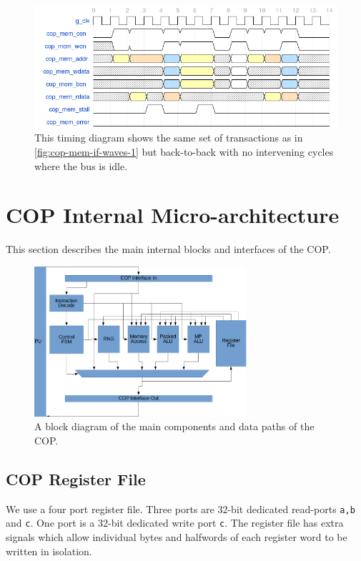 \documentclass{article}
\begin{document}
\begin{figure}[h]
\centering
\includegraphics[width=\textwidth]{./diagrams/cop-mem-if-2.png}
\caption{This timing diagram shows the same set of transactions as in
\ref{fig:cop-mem-if-waves-1} but back-to-back with no intervening cycles
where the bus is idle.}
\label{fig:cop-mem-if-waves-2}
\end{figure}


\section{COP Internal Micro-architecture}
\label{sec:cop-microarch}

This section describes the main internal blocks and interfaces of the COP.

\begin{figure}[H]
\centering
\includegraphics[width=0.7\textwidth]{diagrams/cop-block-diagram.png}
\caption{A block diagram of the main components and data paths of
the COP.}
\label{fig:cop-block-diageam}
\end{figure}

\subsection{COP Register File}

We use a four port register file.
Three ports are 32-bit dedicated read-ports {\tt a,b} and {\tt c}.
One port is a 32-bit dedicated write port {\tt c}.
The register file has extra signals which allow individual bytes and
halfwords of each register word to be written in isolation.
\end{document}
